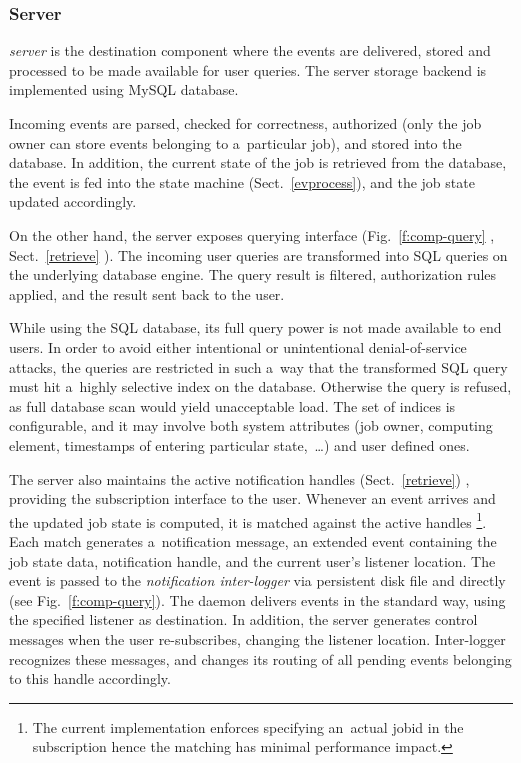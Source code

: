 \subsubsection{Server}
\label{server}
\emph{\LB server} is the destination component where the events are delivered,
stored and processed to be made available for user queries.
The server storage backend is implemented using MySQL database.

Incoming events are parsed, checked for correctness, authorized (only the job
owner can store events belonging to a~particular job), and stored into the
database.
In addition, the current state of the job is retrieved from the database,
the event is fed
into the state machine 
\ifx\insideUG\undefined\relax\else
(Sect.~\ref{evprocess}),
\fi
and the job state updated
accordingly.

On the other hand, the server exposes querying interface (Fig.~\ref{f:comp-query}%
\ifx\insideUG\undefined\relax\else
, Sect.~\ref{retrieve}
\fi
).
The incoming user queries are transformed into SQL queries on the underlying
database engine.
The query result is filtered, authorization rules applied, and the result
sent back to the user.

While using the SQL database, its full query power is not made available
to end users. 
In order to avoid either intentional or unintentional denial-of-service
attacks, the queries are restricted in such a~way that the transformed SQL
query must hit a~highly selective index on the database.
Otherwise the query is refused, as full database scan would yield unacceptable
load.
The set of indices is configurable, and it may involve both \LB system
attributes (\eg job owner, computing element,
timestamps of entering particular state,~\dots) and user defined ones.

The server also maintains the active notification handles%
\ifx\insideUG\undefined\relax\else
(Sect.~\ref{retrieve})
\fi
, providing the subscription interface to the user.
Whenever an event arrives and the updated job state is computed,
it is matched against the active handles%
\footnote{The current implementation enforces specifying an~actual jobid
in the subscription hence the matching has minimal performance impact.}.
Each match generates a~notification message, an extended \LB event
containing the job state data, notification handle,
and the current user's listener location.
The event is passed to the \emph{notification inter-logger} 
via persistent disk file and directly (see Fig.~\ref{f:comp-query}).
The daemon delivers events in the standard way, using the specified
listener as destination.
In addition, the server generates control messages when the user re-subscribes,
changing the listener location.
Inter-logger recognizes these messages, and changes its routing of all
pending events belonging to this handle accordingly.


